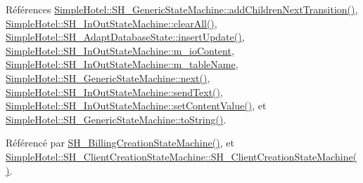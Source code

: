 Références \hyperlink{classSimpleHotel_1_1SH__GenericStateMachine_a3771c91002bec6ab9414703251cc7825}{Simple\-Hotel\-::\-S\-H\-\_\-\-Generic\-State\-Machine\-::add\-Children\-Next\-Transition()}, \hyperlink{classSimpleHotel_1_1SH__InOutStateMachine_a2b6d60f624ba23c8fc3e52f73e867c86}{Simple\-Hotel\-::\-S\-H\-\_\-\-In\-Out\-State\-Machine\-::clear\-All()}, \hyperlink{classSimpleHotel_1_1SH__AdaptDatabaseState_af125e11b83df08b8e67f90c55c69d583}{Simple\-Hotel\-::\-S\-H\-\_\-\-Adapt\-Database\-State\-::insert\-Update()}, \hyperlink{classSimpleHotel_1_1SH__InOutStateMachine_a4b0a3a48b0da31fddb724a357ad9b52c}{Simple\-Hotel\-::\-S\-H\-\_\-\-In\-Out\-State\-Machine\-::m\-\_\-io\-Content}, \hyperlink{classSimpleHotel_1_1SH__InOutStateMachine_a15c063debdaa4c87bd4925867a13ce9e}{Simple\-Hotel\-::\-S\-H\-\_\-\-In\-Out\-State\-Machine\-::m\-\_\-table\-Name}, \hyperlink{classSimpleHotel_1_1SH__GenericStateMachine_a2de14d4920ae8c10b70c2d73fc2d4a93}{Simple\-Hotel\-::\-S\-H\-\_\-\-Generic\-State\-Machine\-::next()}, \hyperlink{classSimpleHotel_1_1SH__InOutStateMachine_ae81d4a51fcd3277ebfc11af978b74c0b}{Simple\-Hotel\-::\-S\-H\-\_\-\-In\-Out\-State\-Machine\-::send\-Text()}, \hyperlink{classSimpleHotel_1_1SH__InOutStateMachine_aaf92da452f6cf7cc57aa9e60f88322e4}{Simple\-Hotel\-::\-S\-H\-\_\-\-In\-Out\-State\-Machine\-::set\-Content\-Value()}, et \hyperlink{classSimpleHotel_1_1SH__GenericStateMachine_ad6dd1d0986c40684410ed94f1f610b12}{Simple\-Hotel\-::\-S\-H\-\_\-\-Generic\-State\-Machine\-::to\-String()}.



Référencé par \hyperlink{classSimpleHotel_1_1SH__BillingCreationStateMachine_a8c7d39e11d0ced1fd9c27a5550465b86}{S\-H\-\_\-\-Billing\-Creation\-State\-Machine()}, et \hyperlink{classSimpleHotel_1_1SH__ClientCreationStateMachine_a301eb77d9ad72102d5fa8952980cf8a3}{Simple\-Hotel\-::\-S\-H\-\_\-\-Client\-Creation\-State\-Machine\-::\-S\-H\-\_\-\-Client\-Creation\-State\-Machine()}.


